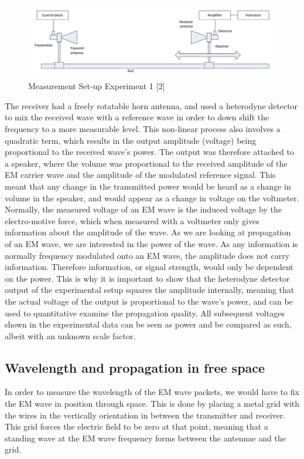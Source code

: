 \documentclass[11pt,a4paper]{article}
\begin{document}
\begin{figure}[H]
\begin{center}
\includegraphics[scale=0.5]{setup_one.PNG}
\caption{Measurement Set-up Experiment 1 [2]}
\label{fig:setup_one}
\end{center}
\end{figure}

The receiver had a freely rotatable horn antenna, and used a heterodyne detector to mix the received wave with a reference wave in order to down shift the frequency to a more measurable level. This non-linear process also involves a quadratic term, which results in the output amplitude (voltage) being proportional to the received wave's power. The output was therefore  attached to a speaker, where the volume was proportional to the received amplitude of the EM carrier wave and the amplitude of the modulated reference signal. This meant that any change in the transmitted power would be heard as a change in volume in the speaker, and would appear as a change in voltage on the voltmeter.\\

Normally, the measured voltage of an EM wave is the induced voltage by the electro-motive force, which when measured with a voltmeter only gives information about the amplitude of the wave. As we are looking at propagation of an EM wave, we are interested in the power of the wave. As any information is normally frequency modulated onto an EM wave, the amplitude does not carry information. Therefore information, or signal strength, would only be dependent on the power. This is why it is important to show that the heterodyne detector output of the experimental setup squares the amplitude internally, meaning that the actual voltage of the output is proportional to the wave's power, and can be used to quantitative examine the propagation quality. All subsequent voltages shown in the experimental data can be seen as power and be compared as such, albeit with an unknown scale factor.

\subsection{Wavelength and propagation in free space}
In order to measure the wavelength of the EM wave packets, we would have to fix the EM wave in position through space. This is done by placing a metal grid with the wires in the vertically orientation in between the transmitter and receiver. This grid forces the electric field to be zero at that point, meaning that a standing wave at the EM wave frequency forms between the antennae and the grid.\\
\end{document}
